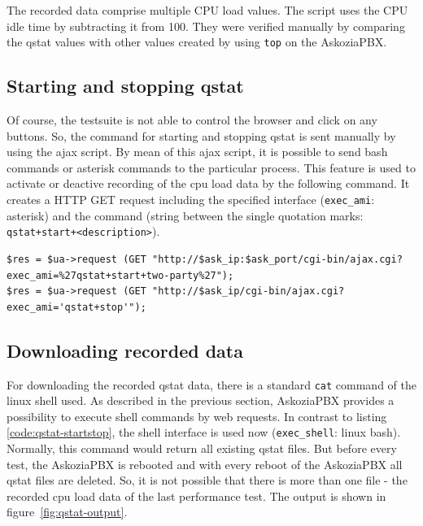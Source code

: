 The recorded data comprise multiple CPU load values. The script uses the CPU idle time by subtracting it from 100.
They were verified manually by comparing the qstat values with other values created by using \texttt{top} on the AskoziaPBX.

\subsection{Starting and stopping qstat}%

Of course, the testsuite is not able to control the browser and click on any buttons.
So, the command for starting and stopping qstat is sent manually by using the ajax script.
By mean of this ajax script, it is possible to send bash commands or asterisk commands to the particular process.
This feature is used to activate or deactive recording of the cpu load data by the following command.
It creates a HTTP GET request including the specified interface (\texttt{exec\_ami}: asterisk) and the
command (string between the single quotation marks: \texttt{qstat+start+<description>}).

\begin{lstlisting}[breaklines=true,label=code:qstat-startstop,caption={Starting and stopping qstat recording} ]
$res = $ua->request (GET "http://$ask_ip:$ask_port/cgi-bin/ajax.cgi?exec_ami=%27qstat+start+two-party%27");
$res = $ua->request (GET "http://$ask_ip/cgi-bin/ajax.cgi?exec_ami='qstat+stop'");
\end{lstlisting}

\newpage
\subsection{Downloading recorded data}%

For downloading the recorded qstat data, there is a standard \texttt{cat} command of the linux shell used.
As described in the previous section, AskoziaPBX provides a possibility to execute shell commands by web requests.
In contrast to listing \ref{code:qstat-startstop}, the shell interface is used now (\texttt{exec\_shell}: linux bash).
Normally, this command would return all existing qstat files. But before every test, the AskoziaPBX is rebooted and
with every reboot of the AskoziaPBX all qstat files are deleted.
So, it is not possible that there is more than one file - the recorded cpu load data of the last performance test.
The output is shown in figure~\ref{fig:qstat-output}.

